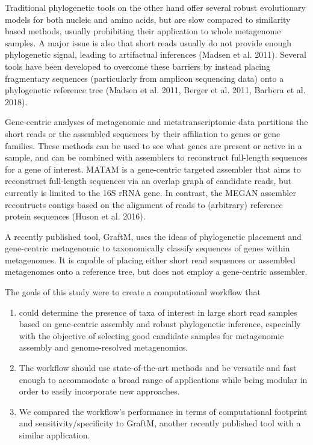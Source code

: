 \documentclass{bioinfo}
\begin{document}
Traditional phylogenetic tools on the other hand offer several robust evolutionary models for both nucleic and amino acids, but are slow compared to similarity based methods, usually prohibiting their application to whole metagenome samples. A major issue is also that short reads usually do not provide enough phylogenetic signal, leading to artifactual inferences (Madsen et al. 2011). Several tools have been developed to overcome these barriers by instead placing fragmentary sequences (particularly from amplicon sequencing data) onto a phylogenetic reference tree (Madsen et al. 2011, Berger et al. 2011, Barbera et al. 2018).

Gene-centric analyses of metagenomic and metatranscriptomic data partitions the short reads or the assembled sequences by their affiliation to genes or gene families. These methods can be used to see what genes are present or active in a sample, and can be combined with assemblers to reconstruct full-length sequences for a gene of interest. MATAM is a gene-centric targeted assembler that aims to reconstruct full-length sequences via an overlap graph of candidate reads, but currently is limited to the 16S rRNA gene. In contrast, the MEGAN assembler recontructs contigs based on the alignment of reads to (arbitrary) reference protein sequences (Huson et al. 2016).

A recently published tool, GraftM, uses the ideas of phylogenetic placement and gene-centric metagenomic to taxonomically classify sequences of genes within metagenomes. It is capable of placing either short read sequences or assembled metagenomes onto a reference tree, but does not employ a gene-centric assembler.

The goals of this study were to create a computational workflow that 
\begin{enumerate}
\item could determine the presence of taxa of interest in large short read samples based on gene-centric assembly and robust phylogenetic inference, especially with the objective of selecting good candidate samples for metagenomic assembly and genome-resolved metagenomics.
\item The workflow should use state-of-the-art methods and be versatile and fast enough to accommodate a broad range of applications while being modular in order to easily incorporate new approaches.
\item We compared the workflow’s performance in terms of computational footprint and sensitivity/specificity to GraftM, another recently published tool with a similar application.
\end{enumerate}
\end{document}
